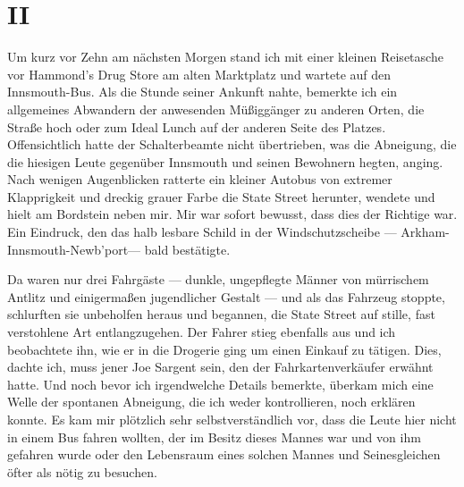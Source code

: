 \chapter*{II}

Um kurz vor Zehn am nächsten Morgen stand ich mit einer kleinen Reisetasche vor Hammond's Drug Store am alten Marktplatz und wartete auf den Innsmouth-Bus. Als die Stunde seiner Ankunft nahte, bemerkte ich ein allgemeines Abwandern der anwesenden Müßiggänger zu anderen Orten, die Straße hoch oder zum Ideal Lunch auf der anderen Seite des Platzes. Offensichtlich hatte der Schalterbeamte nicht übertrieben, was die Abneigung, die die hiesigen Leute gegenüber Innsmouth und seinen Bewohnern hegten, anging. Nach wenigen Augenblicken ratterte ein kleiner Autobus von extremer Klapprigkeit und dreckig grauer Farbe die State Street herunter, wendete und hielt am Bordstein neben mir. Mir war sofort bewusst, dass dies der Richtige war. Ein Eindruck, den das halb lesbare Schild in der Windschutzscheibe --- \glqq Arkham-Innsmouth-Newb'port\grqq --- bald bestätigte.

Da waren nur drei Fahrgäste --- dunkle, ungepflegte Männer von mürrischem Antlitz und einigermaßen jugendlicher Gestalt --- und als das Fahrzeug stoppte, schlurften sie unbeholfen heraus und begannen, die State Street auf stille, fast verstohlene Art entlangzugehen. Der Fahrer stieg ebenfalls aus und ich beobachtete ihn, wie er in die Drogerie ging um einen Einkauf zu tätigen. Dies, dachte ich, muss jener Joe Sargent sein, den der Fahrkartenverkäufer erwähnt hatte. Und noch bevor ich irgendwelche Details bemerkte, überkam mich eine Welle der spontanen Abneigung, die ich weder kontrollieren, noch erklären konnte. Es kam mir plötzlich sehr selbstverständlich vor, dass die Leute hier nicht in einem Bus fahren wollten, der im Besitz dieses Mannes war und von ihm gefahren wurde oder den Lebensraum eines solchen Mannes und Seinesgleichen öfter als nötig zu besuchen.

